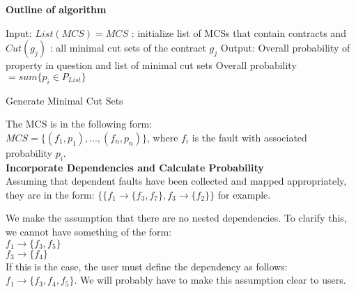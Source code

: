 \textbf{Outline of algorithm}\\

\begin{algorithm}[H]
	Input: $List(MCS) = {MCS}$ : initialize list of MCSs that contain contracts and $Cut(g_j)$ : all minimal cut sets of the contract $g_j$ \;
	Output: Overall probability of property in question and list of minimal cut sets \;
	Overall probability $= sum\{p_i \in P_{List}\}$ \;
	\caption{Generate Minimal Cut Sets}
	\label{alg:repl_alg}
\end{algorithm}

The MCS is in the following form: \\

$MCS = \{(f_1,p_1), ...,(f_n,p_n)\}$, where $f_i$ is the fault with associated probability $p_i$. \\

\textbf{Incorporate Dependencies and Calculate Probability}\\
Assuming that dependent faults have been collected and mapped appropriately, they are in the form: $\{\{f_1 \rightarrow\{f_3, f_7\}, f_3 \rightarrow\{f_2\}\}$ for example. 

We make the assumption that there are no nested dependencies. To clarify this, we cannot have something of the form: \\
$f_1 \rightarrow \{f_3, f_5\}$\\
$f_3 \rightarrow \{f_4\}$\\

If this is the case, the user must define the dependency as follows: $f_1 \rightarrow \{f_3, f_4, f_5\}$. We will probably have to make this assumption clear to users.\\ 

